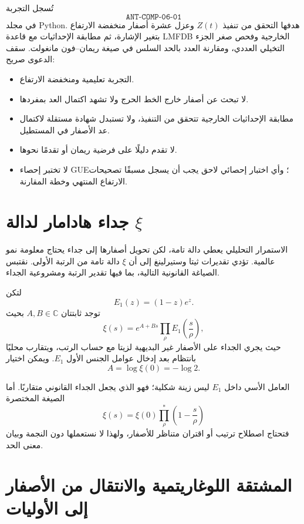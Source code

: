 تُسجل التجربة
\[
\texttt{ANT-COMP-06-01}
\]
في مجلد Python. هدفها التحقق من تنفيذ \(Z(t)\) وعزل عشرة أصفار
منخفضة الارتفاع بتغير الإشارة، ثم مطابقة الإحداثيات مع قاعدة LMFDB
الخارجية وفحص صغر الجزء التخيلي العددي، ومقارنة العدد بالحد السلس في
صيغة ريمان--فون مانغولت. سقف الدعوى صريح:

\begin{itemize}
  \item التجربة تعليمية ومنخفضة الارتفاع.
  \item لا تبحث عن أصفار خارج الخط الحرج ولا تشهد اكتمال العد بمفردها.
  \item مطابقة الإحداثيات الخارجية تتحقق من التنفيذ، ولا تستبدل شهادة
  مستقلة لاكتمال عد الأصفار في المستطيل.
  \item لا تقدم دليلًا على فرضية ريمان أو تقدمًا نحوها.
  \item لا تختبر إحصاء GUE؛ وأي اختبار إحصائي لاحق يجب أن يسجل مسبقًا
  تصحيحات الارتفاع المنتهي وخطة المقارنة.
\end{itemize}

\section{جداء هادامار لدالة \(\xi\)}

الاستمرار التحليلي يعطي دالة تامة، لكن تحويل أصفارها إلى جداء يحتاج
معلومة نمو عالمية. تؤدي تقديرات ثيتا وستيرلينغ إلى أن \(\xi\) دالة
تامة من الرتبة الأولى. نقتبس الصياغة القانونية التالية، بما فيها تقدير
الرتبة ومشروعية الجداء.

\begin{theorem}
\label{thm:xi-hadamard-product}
لتكن
\[
E_1(z)=(1-z)e^z.
\]
توجد ثابتتان \(A,B\in\mathbb{C}\) بحيث
\[
\xi(s)
=
e^{A+Bs}
\prod_{\rho}
E_1\!\left(\frac{s}{\rho}\right),
\]
حيث يجري الجداء على الأصفار غير البديهية لزيتا مع حساب الرتب، ويتقارب
محليًا بانتظام بعد إدخال عوامل الجنس الأول \(E_1\). ويمكن اختيار
\[
A=\log\xi(0)=-\log2.
\]
\end{theorem}

العامل الأسي داخل \(E_1\) ليس زينة شكلية؛ فهو الذي يجعل الجداء
القانوني متقاربًا. أما الصيغة المختصرة
\[
\xi(s)=\xi(0)\prod_\rho^\ast\left(1-\frac{s}{\rho}\right)
\]
فتحتاج اصطلاح ترتيب أو اقتران متناظر للأصفار، ولهذا لا نستعملها دون
النجمة وبيان معنى الحد.

\section{المشتقة اللوغاريتمية والانتقال من الأصفار إلى الأوليات}

